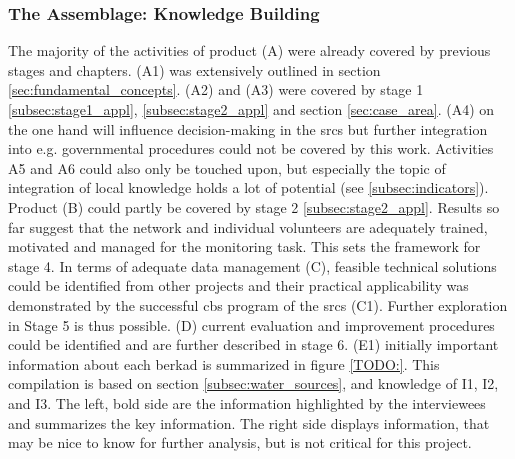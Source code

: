 
\subsubsection{The Assemblage: Knowledge Building}\label{subsubsec:assemblage}

The majority of the activities of product (A) were already covered by previous stages and chapters. (A1) was extensively outlined in section \ref*{sec:fundamental_concepts}. (A2) and (A3) were covered by stage 1 \ref*{subsec:stage1_appl}, \ref*{subsec:stage2_appl} and section \ref*{sec:case_area}. (A4) on the one hand will influence decision-making in the \acrshort{srcs} but further integration into e.g. governmental procedures could not be covered by this work. Activities A5 and A6 could also only be touched upon, but especially the topic of integration of local knowledge holds a lot of potential (see \ref*{subsec:indicators}).\newline
Product (B) could partly be covered by stage 2 \ref*{subsec:stage2_appl}. Results so far suggest that the network and individual volunteers are adequately trained, motivated and managed for the monitoring task. This sets the framework for stage 4. In terms of adequate data management (C), feasible technical solutions could be identified from other projects and their practical applicability was demonstrated by the successful \acrshort{cbs} program of the \acrshort{srcs} (C1). Further exploration in Stage 5 is thus possible. (D) current evaluation and improvement procedures could be identified and are further described in stage 6.\newline
(E1) initially important information about each berkad is summarized in figure \ref*{TODO:}. This compilation is based on section \ref*{subsec:water_sources}, and knowledge of I1, I2, and I3. The left, bold side are the information highlighted by the interviewees and summarizes the key information. The right side displays information, that may be nice to know for further analysis, but is not critical for this project.

